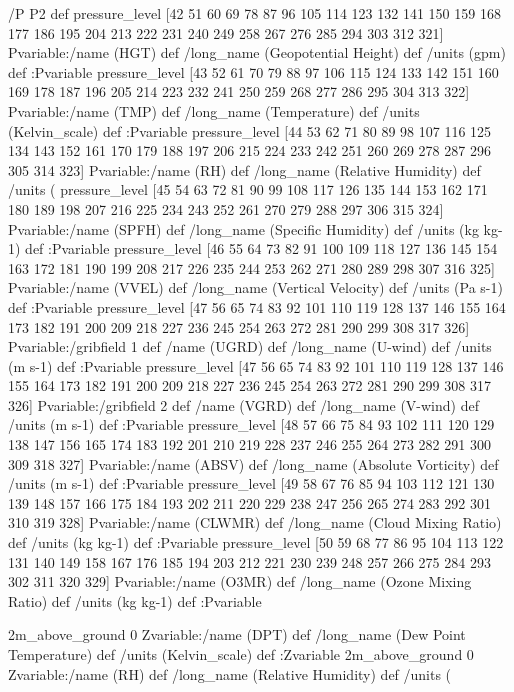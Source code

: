 \begin{ingrid}

/P P2 def
pressure_level [42 51 60 69 78 87 96 105 114 123 132 141 150 159 168 177 186 195 204 213 222 231 240 249 258 267 276 285 294 303 312 321] Pvariable:/name (HGT) def /long_name (Geopotential Height) def /units (gpm) def :Pvariable
pressure_level [43 52 61 70 79 88 97 106 115 124 133 142 151 160 169 178 187 196 205 214 223 232 241 250 259 268 277 286 295 304 313 322] Pvariable:/name (TMP) def /long_name (Temperature) def /units (Kelvin_scale) def :Pvariable
pressure_level [44 53 62 71 80 89 98 107 116 125 134 143 152 161 170 179 188 197 206 215 224 233 242 251 260 269 278 287 296 305 314 323] Pvariable:/name (RH) def /long_name (Relative Humidity) def /units (%
pressure_level [45 54 63 72 81 90 99 108 117 126 135 144 153 162 171 180 189 198 207 216 225 234 243 252 261 270 279 288 297 306 315 324] Pvariable:/name (SPFH) def /long_name (Specific Humidity) def /units (kg kg-1) def :Pvariable
pressure_level [46 55 64 73 82 91 100 109 118 127 136 145 154 163 172 181 190 199 208 217 226 235 244 253 262 271 280 289 298 307 316 325] Pvariable:/name (VVEL) def /long_name (Vertical Velocity) def /units (Pa s-1) def :Pvariable
pressure_level [47 56 65 74 83 92 101 110 119 128 137 146 155 164 173 182 191 200 209 218 227 236 245 254 263 272 281 290 299 308 317 326] Pvariable:/gribfield 1 def /name (UGRD) def /long_name (U-wind) def /units (m s-1) def :Pvariable
pressure_level [47 56 65 74 83 92 101 110 119 128 137 146 155 164 173 182 191 200 209 218 227 236 245 254 263 272 281 290 299 308 317 326] Pvariable:/gribfield 2 def /name (VGRD) def /long_name (V-wind) def /units (m s-1) def :Pvariable
pressure_level [48 57 66 75 84 93 102 111 120 129 138 147 156 165 174 183 192 201 210 219 228 237 246 255 264 273 282 291 300 309 318 327] Pvariable:/name (ABSV) def /long_name (Absolute Vorticity) def /units (m s-1) def :Pvariable
pressure_level [49 58 67 76 85 94 103 112 121 130 139 148 157 166 175 184 193 202 211 220 229 238 247 256 265 274 283 292 301 310 319 328] Pvariable:/name (CLWMR) def /long_name (Cloud Mixing Ratio) def /units (kg kg-1) def :Pvariable
pressure_level [50 59 68 77 86 95 104 113 122 131 140 149 158 167 176 185 194 203 212 221 230 239 248 257 266 275 284 293 302 311 320 329] Pvariable:/name (O3MR) def /long_name (Ozone Mixing Ratio) def /units (kg kg-1) def :Pvariable

\end{ingrid}
\begin{ingrid}

2m_above_ground  0 Zvariable:/name (DPT) def /long_name (Dew Point Temperature) def /units (Kelvin_scale) def :Zvariable
2m_above_ground  0 Zvariable:/name (RH) def /long_name (Relative Humidity) def /units (%

\end{ingrid}
